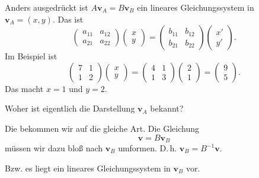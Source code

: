 \documentclass{beamer}
\newcommand{\bv}[1]{\mathbf{#1}}
\begin{document}
\begin{frame}
Anders ausgedrückt ist $A\bv v_A = B\bv v_B$ ein lineares
Gleichungssystem in $\bv v_A=(x,y)$.\pause{} Das ist
\[\begin{pmatrix}a_{11} & a_{12}\\ a_{21} & a_{22}\end{pmatrix}\begin{pmatrix}x\\ y\end{pmatrix}
= \begin{pmatrix}b_{11} & b_{12}\\ b_{21} & b_{22}\end{pmatrix}\begin{pmatrix}x'\\ y'\end{pmatrix}.
\]\pause{}
Im Beispiel ist
\[\begin{pmatrix}7 & 1\\ 1 & 2\end{pmatrix}\begin{pmatrix}x\\ y\end{pmatrix}
= \begin{pmatrix}4 & 1\\ 1 & 3\end{pmatrix}\begin{pmatrix}2\\ 1\end{pmatrix}
= \begin{pmatrix}9\\ 5\end{pmatrix}.\]\pause
Das macht $x=1$ und $y=2$.
\end{frame}

\begin{frame}
Woher ist eigentlich die Darstellung $\bv v_A$ bekannt?\pause

\vspace{0.8em}
Die bekommen wir auf die gleiche Art.  Die Gleichung
\[\bv v = B\bv v_B\]
müssen wir dazu bloß nach $\bv v_B$ umformen. D.\,h.
$\bv v_B = B^{-1}\bv v$.\pause

\vspace{0.8em}
Bzw. es liegt ein lineares Gleichungssystem
in $\bv v_B$ vor.
\end{frame}
\end{document}

